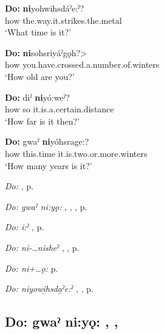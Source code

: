 \ea
\label{ex:dpart45}
\gll \textbf{Do:} \textbf{ni}yohwihsdáˀe:ˀ? \\
how the.way.it.strikes.the.metal \\
\glt ‘What time is it?’
\z

\ea
\label{ex:dpart46}
\gll \textbf{Do:} \textbf{ni}sohsriyáˀgǫh?> \\
how you.have.crossed.a.number.of.winters \\
\glt ‘How old are you?’
\z

\ea
\label{ex:dpart47}
\gll \textbf{Do:} diˀ \textbf{ni}yó:weˀ? \\
how so it.is.a.certain.distance \\
\glt ‘How far is it then?’
\z

\ea
\label{ex:dpart48}
\gll \textbf{Do:} gwaˀ \textbf{ni}yóhsrage:? \\
how this.time it.is.two.or.more.winters \\
\glt ‘How many years is it?’
\z

\begin{CayugaRelated}
\item \textit{Do:} , p. \pageref{p:[do:]}\\
\item \textit{Do: gwaˀ ni:yǫ:} , , , p. \pageref{p:[do: gwaˀ ni:yǫ:]}\\
\item \textit{Do: i:ˀ}  , p. \pageref{p:[do: i:ˀ]}\\
\item \textit{Do: ni-…nisheˀ} , , p. \pageref{p:[do: ni-…nisheˀ]}\\
\item \textit{Do: ni+…ǫ:}  p. \pageref{p:[do: ni+…ǫ:]}\\
\item \textit{Do: niyowi̱hsda̱ˀe:ˀ} , , p. \pageref{p:[do: niyowihsdaˀe:ˀ]}
\end{CayugaRelated}

\subsection*{\textbf{Do: gwaˀ ni:yǫ:} , , } \label{p:[do: gwaˀ ni:yǫ:]}


